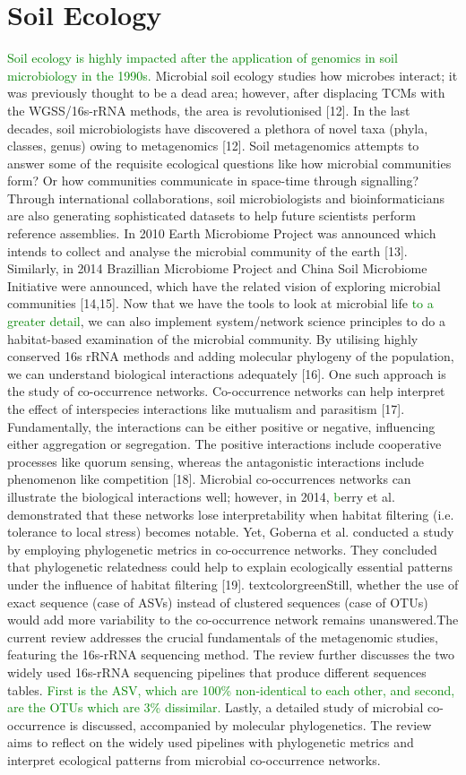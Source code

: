 \section{Soil Ecology}
\textcolor{green}{Soil ecology is highly impacted after the application of genomics in soil microbiology in the 1990s.} Microbial soil ecology studies how microbes interact; it was previously thought to be a dead area; however, after displacing TCMs with the WGSS/16s-rRNA methods, the area is revolutionised [12]. In the last decades, soil microbiologists have discovered a plethora of novel taxa (phyla, classes, genus) owing to metagenomics [12]. Soil metagenomics attempts to answer some of the requisite ecological questions like how microbial communities form? Or how communities communicate in space-time through signalling? Through international collaborations, soil microbiologists and bioinformaticians are also generating sophisticated datasets to help future scientists perform reference assemblies. In 2010 Earth Microbiome Project was announced which intends to collect and analyse the microbial community of the earth [13]. Similarly, in 2014 Brazillian Microbiome Project and China Soil Microbiome Initiative were announced, which have the related vision of exploring microbial communities [14,15]. Now that we have the tools to look at microbial life \textcolor{green}{to a greater detail}, we can also implement system/network science principles to do a habitat-based examination of the microbial community. By utilising highly conserved 16s rRNA methods and adding molecular phylogeny of the population, we can understand biological interactions adequately [16]. One such approach is the study of co-occurrence networks. Co-occurrence networks can help interpret the effect of interspecies interactions like mutualism and parasitism [17]. Fundamentally, the interactions can be either positive or negative, influencing either aggregation or segregation. The positive interactions include cooperative processes like quorum sensing, whereas the antagonistic interactions include phenomenon like competition [18]. Microbial co-occurrences networks can illustrate the biological interactions well; however, in 2014, \textcolor{green}{b}erry et al. demonstrated that these networks lose interpretability when habitat filtering (i.e. tolerance to local stress) becomes notable. Yet, Goberna et al. conducted a study by employing phylogenetic metrics in co-occurrence networks. They concluded that phylogenetic relatedness could help to explain ecologically essential patterns under the influence of habitat filtering [19]. textcolor{green}{Still, whether the use of exact sequence (case of ASVs) instead of clustered sequences (case of OTUs) would add more variability to the co-occurrence network remains unanswered.}\newline \newline The current review addresses the crucial fundamentals of the metagenomic studies, featuring the 16s-rRNA sequencing method. The review further discusses the two widely used 16s-rRNA sequencing pipelines that produce different sequences tables. \textcolor{green}{First is the ASV, which are 100\% non-identical to each other, and second, are the OTUs which are 3\% dissimilar.} Lastly, a detailed study of microbial co-occurrence is discussed, accompanied by molecular phylogenetics. The review aims to reflect on the widely used pipelines with phylogenetic metrics and interpret ecological patterns from microbial co-occurrence networks.